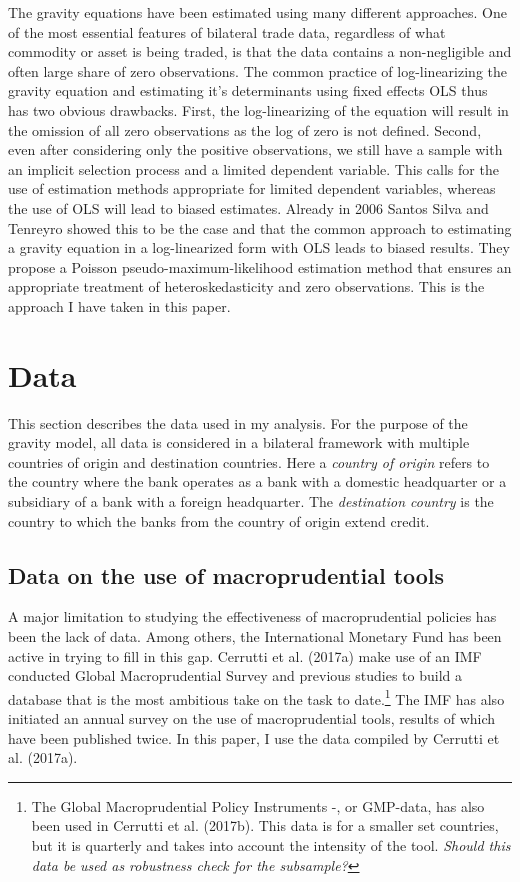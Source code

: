 \documentclass[12pt,a4paper]{article}
\begin{document}
The gravity equations have been estimated using many different approaches. One of the most essential features of bilateral trade data, regardless of what commodity or asset is being traded, is that the data contains a non-negligible and often large share of zero observations. The common practice of log-linearizing the gravity equation and estimating it's determinants using fixed effects OLS thus has two obvious drawbacks. First, the log-linearizing of the equation will result in the omission of all zero observations as the log of zero is not defined. Second, even after considering only the positive observations, we still have a sample with an implicit selection process and a limited dependent variable. This calls for the use of estimation methods appropriate for limited dependent variables, whereas the use of OLS will lead to biased estimates. Already in 2006 Santos Silva and Tenreyro showed this to be the case and that the common approach to estimating a gravity equation in a log-linearized form with OLS leads to biased results. They propose a Poisson pseudo-maximum-likelihood estimation method that ensures an appropriate treatment of heteroskedasticity and zero observations. This is the approach I have taken in this paper. 

\newpage
\section{Data}

This section describes the data used in my analysis. For the purpose of the gravity model, all data is considered in a bilateral framework with multiple countries of origin and destination countries. Here a \textit{country of origin }refers to the country where the bank operates as a bank with a domestic headquarter or a subsidiary of a bank with a foreign headquarter. The \textit{destination country} is the country to which the banks from the country of origin extend credit. 

\subsection{Data on the use of macroprudential tools}

A major limitation to studying the effectiveness of macroprudential policies has been the lack of data. Among others, the International Monetary Fund has been active in trying to fill in this gap. Cerrutti et al. (2017a) make use of an IMF conducted Global Macroprudential Survey and previous studies to build a database that is the most ambitious take on the task to date.\footnote{The Global Macroprudential Policy Instruments -, or GMP-data, has also been used in Cerrutti et al. (2017b). This data is for a smaller set countries, but it is quarterly and takes into account the intensity of the tool. \textit{Should this data be used as robustness check for the subsample?}} The IMF has also initiated an annual survey on the use of macroprudential tools, results of which have been published twice.  In this paper, I use the data compiled by Cerrutti et al. (2017a).
\end{document}
